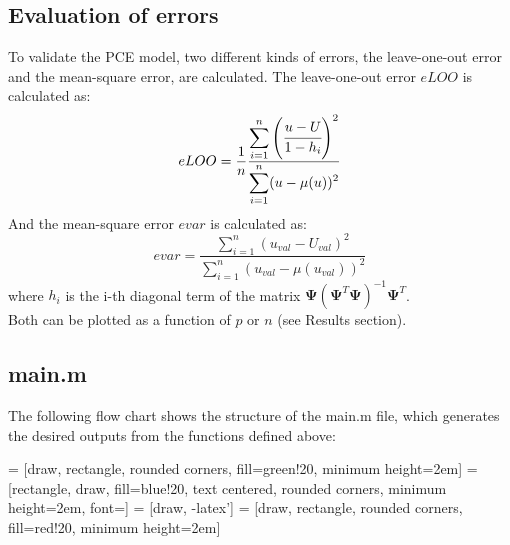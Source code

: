 \documentclass[a4paper,12pt]{article} %
\begin{document}
\subsection{Evaluation of errors}
To validate the PCE model, two different kinds of errors, the leave-one-out error and the mean-square error, are calculated. The leave-one-out error $eLOO$ is calculated as:
\begin{equation}
    eLOO = \frac{1}{n} \frac{\displaystyle\sum_{i=1}^{n} \left( \cfrac{u-U}{1-h_i} \right)^2}{\displaystyle\sum_{i=1}^{n}  (u-\mu(u))^2}
\end{equation}
And the mean-square error $evar$ is calculated as:
\begin{equation}
    evar = \frac{\displaystyle\sum_{i=1}^{n} (u_{val}-U_{val})^2}{\displaystyle\sum_{i=1}^{n} (u_{val}-\mu(u_{val}))^2}  
\end{equation}
where $h_i$ is the i-th diagonal term of the matrix $\mathbf{\Psi}(\mathbf{\Psi}^T\mathbf{\Psi})^{-1} \mathbf{\Psi}^T$.\\
Both can be plotted as a function of $p$ or $n$ (see Results section).\\
\newpage
\subsection{main.m}
The following flow chart shows the structure of the main.m file, which generates the desired outputs from the functions defined above:

 = [draw, rectangle, rounded corners, fill=green!20, minimum height=2em]
 = [rectangle, draw, fill=blue!20,  text centered, rounded corners, minimum height=2em, font=\ttfamily\normalsize]
 = [draw, -latex']
 = [draw, rectangle, rounded corners, fill=red!20, minimum height=2em]
\end{document}
